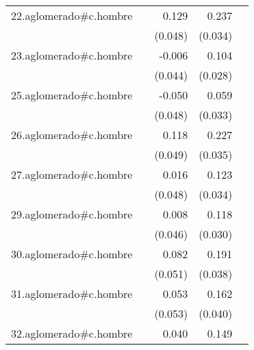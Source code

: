 {\begin{longtable}{l*{4}{D{.}{.}{-1}}}
\addlinespace
22.aglomerado#c.hombre&                     &       0.129\sym{**} &       0.237\sym{***}&                     \\
            &                     &     (0.048)         &     (0.034)         &                     \\
\addlinespace
23.aglomerado#c.hombre&                     &      -0.006         &       0.104\sym{***}&                     \\
            &                     &     (0.044)         &     (0.028)         &                     \\
\addlinespace
25.aglomerado#c.hombre&                     &      -0.050         &       0.059         &                     \\
            &                     &     (0.048)         &     (0.033)         &                     \\
\addlinespace
26.aglomerado#c.hombre&                     &       0.118\sym{*}  &       0.227\sym{***}&                     \\
            &                     &     (0.049)         &     (0.035)         &                     \\
\addlinespace
27.aglomerado#c.hombre&                     &       0.016         &       0.123\sym{***}&                     \\
            &                     &     (0.048)         &     (0.034)         &                     \\
\addlinespace
29.aglomerado#c.hombre&                     &       0.008         &       0.118\sym{***}&                     \\
            &                     &     (0.046)         &     (0.030)         &                     \\
\addlinespace
30.aglomerado#c.hombre&                     &       0.082         &       0.191\sym{***}&                     \\
            &                     &     (0.051)         &     (0.038)         &                     \\
\addlinespace
31.aglomerado#c.hombre&                     &       0.053         &       0.162\sym{***}&                     \\
            &                     &     (0.053)         &     (0.040)         &                     \\
\addlinespace
32.aglomerado#c.hombre&                     &       0.040         &       0.149\sym{***}&                     \\

\end{longtable}}
